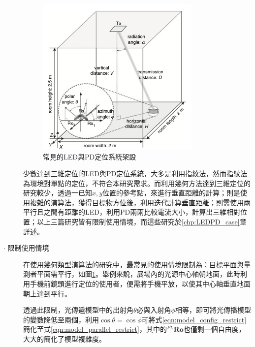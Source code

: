 \begin{description}
            \begin{figure}[h]
                \centering
                \includegraphics[width=8cm]{ch2pic/case_parallel.png}
                \caption{常見的LED與PD定位系統架設\cite{case:aoa}}
                \label{pic:case_parallel}
            \end{figure}
            
            \qquad
            少數達到三維定位的LED與PD定位系統，大多是利用指紋法\cite{case:ml}，然而指紋法為環境對單點的定位，不符合本研究需求。而利用幾何方法達到三維定位的研究較少，\cite{case:cart3d}透過一已知$x,y$位置的參考點，來進行垂直距離的計算；\cite{case:3d_layers}則是使用複雜的演算法，獲得目標物方位後，利用迭代計算垂直距離；\cite{case:hypercube}則需使用兩平行且之間有距離的LED，利用PD兩兩比較電流大小，計算出三維相對位置；以上三篇研究皆有限制使用情境，而這些研究於\ref{chp:LEDPD_case}章詳述。



            \item[$\cdot$ 限制使用情境]   \hfill
            
            \qquad
            在使用幾何類型演算法的研究中，最常見的使用情境限制為：目標平面與量測者平面需平行，如圖\ref{pic:case_parallel}。舉例來說，展場內的光源中心軸朝地面，此時利用手機前鏡頭進行定位的使用者，便需將手機平放，以使其中心軸垂直地面朝上達到平行。

            \qquad
            透過此限制，光傳遞模型中的出射角$\theta$必與入射角$\phi$相等，即可將光傳播模型的變數降低至兩個，利用$\cos\theta=\cos\phi$可將式\ref{eqn:model_config_restrict}簡化至式\ref{eqn:model_parallel_restrict}，其中的$^{PL}\boldsymbol{Ro}$也僅剩一個自由度，大大的簡化了模型複雜度。



\end{description}
